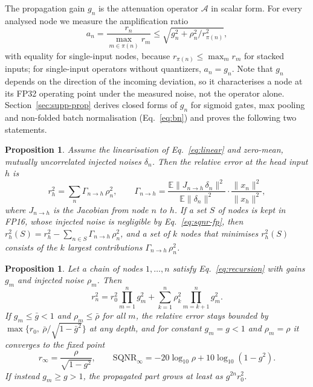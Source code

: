 \documentclass[pdflatex,sn-mathphys-num]{sn-jnl}%
\theoremstyle{thmstyleone}%
\newtheorem{proposition}[theorem]{Proposition}%
\theoremstyle{thmstyletwo}%
\theoremstyle{thmstylethree}%
\begin{document}
The propagation gain $g_n$ is the attenuation operator $\mathcal{A}$ in scalar form. For every analysed node we measure the amplification ratio
\begin{equation}
a_n=\frac{r_n}{\max_{m\in\pi(n)}r_m}\leq\sqrt{g_n^2+\rho_n^2/r_{\pi(n)}^2},\label{eq:amplification}
\end{equation}
with equality for single-input nodes, because $r_{\pi(n)}\leq\max_m r_m$ for stacked inputs; for single-input operators without quantizers, $a_n=g_n$. Note that $g_n$ depends on the direction of the incoming deviation, so it characterises a node at its FP32 operating point under the measured noise, not the operator alone. Section~\ref{sec:supp-prop} derives closed forms of $g_n$ for sigmoid gates, max pooling and non-folded batch normalisation (Eq.~\eqref{eq:bn}) and proves the following two statements.
\begin{proposition}\label{prop:selective}
Assume the linearisation of Eq.~\eqref{eq:linear} and zero-mean, mutually uncorrelated injected noises $\delta_n$. Then the relative error at the head input $h$ is
\begin{equation}
r_h^2=\sum_{n}\Gamma_{n\to h}\,\rho_n^2,\qquad\Gamma_{n\to h}=\frac{\mathbb{E}\lVert J_{n\to h}\,\delta_n\rVert^2}{\mathbb{E}\lVert\delta_n\rVert^2}\cdot\frac{\lVert x_n\rVert^2}{\lVert x_h\rVert^2},\label{eq:additive}
\end{equation}
where $J_{n\to h}$ is the Jacobian from node $n$ to $h$. If a set $S$ of nodes is kept in FP16, whose injected noise is negligible by Eq.~\eqref{eq:sqnr-fp}, then $r_h^2(S)=r_h^2-\sum_{n\in S}\Gamma_{n\to h}\,\rho_n^2$, and a set of $k$ nodes that minimises $r_h^2(S)$ consists of the $k$ largest contributions $\Gamma_{n\to h}\,\rho_n^2$.
\end{proposition}
\begin{proposition}\label{prop:fixedpoint}
Let a chain of nodes $1,\dots,n$ satisfy Eq.~\eqref{eq:recursion} with gains $g_m$ and injected noise $\rho_m$. Then
\begin{equation}
r_n^2=r_0^2\prod_{m=1}^{n}g_m^2+\sum_{k=1}^{n}\rho_k^2\prod_{m=k+1}^{n}g_m^2.\label{eq:unrolled}
\end{equation}
If $g_m\le\bar g<1$ and $\rho_m\le\bar\rho$ for all $m$, the relative error stays bounded by $\max\{r_0,\ \bar\rho/\sqrt{1-\bar g^2}\}$ at any depth, and for constant $g_m=g<1$ and $\rho_m=\rho$ it converges to the fixed point
\begin{equation}
r_\infty=\frac{\rho}{\sqrt{1-g^2}},\qquad \mathrm{SQNR}_\infty=-20\log_{10}\rho+10\log_{10}\left(1-g^2\right).\label{eq:fixedpoint}
\end{equation}
If instead $g_m\ge g>1$, the propagated part grows at least as $g^{2n}r_0^2$.
\end{proposition}
\end{document}
